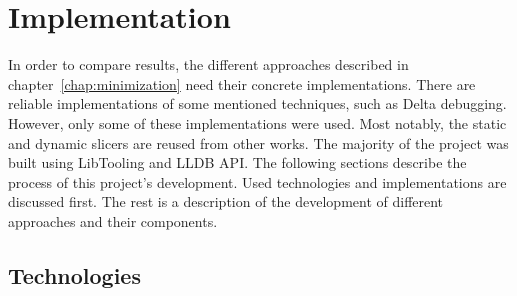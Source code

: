 \chapter{Implementation}

In order to compare results, the different approaches described in 
chapter~\ref{chap:minimization} need their concrete implementations.
There are reliable implementations of some mentioned techniques, such as 
Delta debugging.
However, only some of these implementations were used.
Most notably, the static and dynamic slicers are reused from other works.
The majority of the project was built using LibTooling and LLDB API.
The following sections describe the process of this project's development.
Used technologies and implementations are discussed first.
The rest is a description of the development of different approaches and 
their components.

\section{Technologies}

